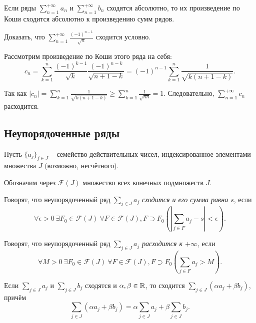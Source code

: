 \begin{corollary}
    Если ряды $\sum_{n = 1}^{+\infty} a_n$ и $\sum_{n = 1}^{+\infty} b_n$ сходятся абсолютно, то их произведение по Коши сходится абсолютно к произведению сумм рядов.
\end{corollary}

\begin{example}
    Доказать, что $\sum_{n = 1}^{+\infty} \frac{(-1)^{n - 1}}{\sqrt{n}}$ сходится условно.
\end{example}

\begin{solution}
    Рассмотрим произведение по Коши этого ряда на себя:
    \[
        c_n = \sum_{k = 1}^n \frac{(-1)^{k - 1}}{\sqrt{k}} \frac{(-1)^{n - k}}{\sqrt{n + 1 - k}} = (-1)^{n - 1} \sum_{k = 1}^n \frac{1}{\sqrt{k(n + 1 - k)}}.
    \]

    Так как $|c_n| = \sum_{k = 1}^n \frac{1}{\sqrt{k(n + 1 - k)}} \ge \sum_{k = 1}^n \frac{1}{\sqrt{nn}} = 1$. Следовательно, $\sum_{n = 1}^{+\infty} c_n$ расходится.
\end{solution}

\subsection{Неупорядоченные ряды}

Пусть $\{a_j\}_{j \in J}$ -- семейство действительных чисел, индексированное элементами множества $J$ (возможно, несчётного).

Обозначим через $\mathcal{F}(J)$ множество всех конечных подмножеств $J$.

\begin{definition}
    Говорят, что неупорядоченный ряд $\sum_{j \in J} a_j$ \emph{сходится и его сумма равна $s$}, если
    \[
        \forall \epsilon > 0 \  \exists F_0 \in \mathcal{F}(J) \  \forall F \in \mathcal{F}(J), F \supset F_0 \left(\left|\sum_{j \in F} a_j - s\right| < \epsilon\right).
    \]

    Говорят, что неупорядоченный ряд $\sum_{j \in J} a_j$ \emph{расходится к  $+\infty$}, если
    \[
        \forall M > 0 \ \exists F_0 \in \mathcal{F}(J) \ \forall F \in \mathcal{F}(J), F \supset F_0 \left(\sum_{j \in F} a_j > M\right).
    \]
\end{definition}

\begin{property}[линейность]
    Если $\sum_{j \in J} a_j$ и $\sum_{j \in J} b_j$ сходятся и $\alpha, \beta \in \mathbb{R}$, то сходится $\sum_{j \in J} (\alpha a_j + \beta b_j)$, причём
    \[
        \sum_{j \in J} (\alpha a_j + \beta b_j) = \alpha \sum_{j \in J} a_j + \beta \sum_{j \in J} b_j.
    \]
\end{property}

